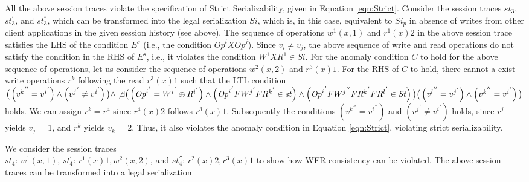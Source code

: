 \documentclass{sig-alternate-05-2015}
\begin{document}
 All the above session traces violate the specification of Strict Serializability, given in Equation
 \ref{eqn:Strict}. Consider the session traces $\mathit{st}_3$, $\mathit{st}_3^{'}$, and $\mathit{st}_3^{''}$, which can be transformed into the legal
 serialization $\mathit{Si}$, which is, in this case, equivalent to  $\mathit{Si}_p$ in absence of writes from other
 client applications in the given session history (see above). The sequence of operations $w^1(x,1)$ and
 $r^1(x){2}$ in the above session trace satisfies the LHS of the condition $E^s$ (i.e., the condition
 $\mathit{Op}^i X \mathit{Op}^j$). Since $v_i \not= v_j$, the above sequence of write and read operations
 do not satisfy the condition  in the RHS of $E^s$, i.e., it violates the condition $W^1 X R^1 \in \mathit{Si}$.
 For the anomaly condition $C$ to hold for the above sequence of operations, let us consider the
 sequence of operations $w^2(x,2)$ and $r^3(x)1$. For the RHS of $C$ to hold, there cannot a exist write operations $r^k$ following the read $r^3(x)1$ such that the
  LTL condition $\big(  \left( {v^k}^{''} = {v^i}^{'} \right) \wedge   \left( {v^j}^{'} \not= {v^i}^{'} \right) \big) \wedge
 \not\exists \big(  \left( {\mathit{Op}^i}^{'} = {W^i}^{'}  \oplus {R^i}^{'}  \right) \wedge  \left( {\mathit{Op}^i}^{'}  F {W^j}^{'} F  {R^k}^{'} \in \mathit{st} \right) \wedge \left( {\mathit{Op}^i}^{'} F {W^j}^{''}   F  {R^k}^{'}  F  {R^l}^{'} \in \mathit{St} \right) \big) \\
 \big(  \left( {v^l}^{''} = {v^j}^{'} \right) \wedge   \left( {v^k}^{''} = {v^i}^{'} \right) \big)$
 holds.
 We can assign $r^k = r^4$ since $r^4(x)2$ follows $r^3(x)1$. Subsequently the conditions $\left( {v^k}^{''} = {v^i}^{''} \right)$
and $\left( {v^j}^{'} \not= {v^i}^{'} \right)$ holds, since $r^j$ yields $v_j$ = 1, and
 $r^k$ yields $v_k$ = 2.
 Thus, it also violates the anomaly condition in Equation \ref{eqn:Strict}, violating strict serializability.
 \par  We consider the session traces \\ $\mathit{st}_4$: $w^1(x,1)$, $\mathit{st}_4^{'}$: $r^1(x){1}, w^2(x,2)$, and
 $\mathit{st}_4^{''}$: $r^2(x){2}, r^3(x){1}$ to show how
 WFR consistency can be violated. The above session traces can be transformed into a legal serialization
\end{document}

